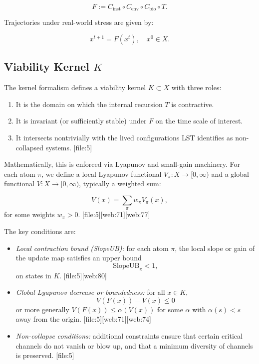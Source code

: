 \documentclass[11pt]{article}
\begin{document}
\begin{equation}
  F := C_{\text{inst}} \circ C_{\text{env}} \circ C_{\text{bio}} \circ T.
  \label{eq:F}
\end{equation}

Trajectories under real-world stress are given by:

\[
  x^{t+1} = F(x^t),\quad x^0\in X.
\]

\subsection{Viability Kernel \(K\)}

The kernel formalism defines a viability kernel \(K\subset X\) with three roles:

\begin{enumerate}[label=(\roman*), leftmargin=*]
  \item It is the domain on which the internal recursion \(T\) is contractive.
  \item It is invariant (or sufficiently stable) under \(F\) on the time scale of interest.
  \item It intersects nontrivially with the lived configurations LST identifies as non-collapsed systems. [file:5]
\end{enumerate}

Mathematically, this is enforced via Lyapunov and small-gain machinery. For each atom \(\pi\), we define a local Lyapunov functional \(V_\pi:X\to[0,\infty)\) and a global functional \(V:X\to[0,\infty)\), typically a weighted sum:

\[
  V(x) = \sum_{\pi} w_\pi V_\pi(x),
\]
for some weights \(w_\pi >0\). [file:5][web:71][web:77]

The key conditions are:

\begin{itemize}[leftmargin=*]
  \item \emph{Local contraction bound (SlopeUB):} for each atom \(\pi\), the local slope or gain of the update map satisfies an upper bound
  \[
    \text{SlopeUB}_\pi < 1,
  \]
  on states in \(K\). [file:5][web:80]
  \item \emph{Global Lyapunov decrease or boundedness:} for all \(x\in K\),
  \[
    V(F(x)) - V(x) \leq 0
  \]
  or more generally \(V(F(x)) \leq \alpha(V(x))\) for some \(\alpha\) with \(\alpha(s) < s\) away from the origin. [file:5][web:71][web:74]
  \item \emph{Non-collapse conditions:} additional constraints ensure that certain critical channels do not vanish or blow up, and that a minimum diversity of channels is preserved. [file:5]
\end{itemize}
\end{document}
